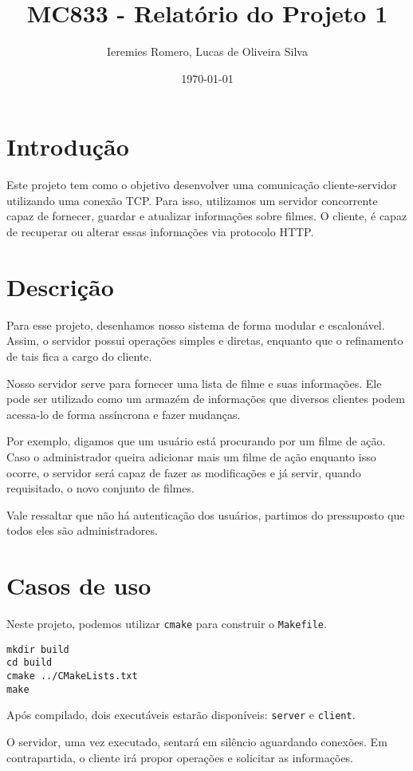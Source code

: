 \documentclass[11pt]{article}
\author{Ieremies Romero, Lucas de Oliveira Silva}
\date{\today}
\title{MC833 - Relatório do Projeto 1}
\theoremstyle{definition}
\theoremstyle{definition}
\theoremstyle{remark}
\theoremstyle{remark}
\theoremstyle{remark}
\theoremstyle{remark}
\theoremstyle{definition}
\begin{document}
\maketitle

\section*{Introdução}
\label{sec:org54b0d6c}
Este projeto tem como o objetivo desenvolver uma comunicação cliente-servidor utilizando uma conexão TCP. Para isso, utilizamos um servidor concorrente capaz de fornecer, guardar e atualizar informações sobre filmes. O cliente, é capaz de recuperar ou alterar essas informações via protocolo HTTP.

\section*{Descrição}
\label{sec:org3d3db05}
Para esse projeto, desenhamos nosso sistema de forma modular e escalonável. Assim, o servidor possui operações simples e diretas, enquanto que o refinamento de tais fica a cargo do cliente.

Nosso servidor serve para fornecer uma lista de filme e suas informações. Ele pode ser utilizado como um armazém de informações que diversos clientes podem acessa-lo de forma assíncrona e fazer mudanças.

Por exemplo, digamos que um usuário está procurando por um filme de ação. Caso o administrador queira adicionar mais um filme de ação enquanto isso ocorre, o servidor será capaz de fazer as modificações e já servir, quando requisitado, o novo conjunto de filmes.

Vale ressaltar que não há autenticação dos usuários, partimos do pressuposto que todos eles são administradores.
\section*{Casos de uso}
\label{sec:orga72436f}
Neste projeto, podemos utilizar \texttt{cmake} para construir o \texttt{Makefile}.

\begin{verbatim}
mkdir build
cd build
cmake ../CMakeLists.txt
make
\end{verbatim}

Após compilado, dois executáveis estarão disponíveis: \texttt{server} e \texttt{client}.

O servidor, uma vez executado, sentará em silêncio aguardando conexões. Em contrapartida, o cliente irá propor operações e solicitar as informações.
\end{document}
